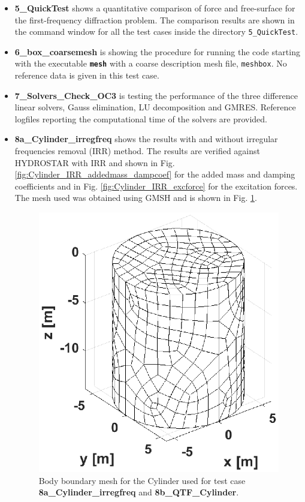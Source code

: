 \documentclass[12pt,a4paper,titlepage]{article}
\begin{document}
\begin{itemize}
\item \textbf{5\_QuickTest} shows a quantitative comparison of force and free-surface for the first-frequency diffraction problem. The comparison results are shown in the command window for all the test cases inside the directory \texttt{5\_QuickTest}.

\item \textbf{6\_box\_coarsemesh} is showing the procedure for running the code starting with the executable \textbf{\texttt{mesh}} with a coarse description mesh file, \texttt{meshbox}. No reference data is given in this test case.

\item \textbf{7\_Solvers\_Check\_OC3} is testing the performance of the three difference linear solvers, Gauss elimination, LU decomposition and GMRES. Reference logfiles reporting the computational time of the solvers are provided.

\item \textbf{8a\_Cylinder\_irregfreq} shows the results with and without irregular frequencies removal (IRR) method. The results are verified against HYDROSTAR with IRR and shown in Fig. \ref{fig:Cylinder_IRR_addedmass_dampcoef} for the added mass and damping coefficients and in Fig. \ref{fig:Cylinder_IRR_excforce} for the excitation forces. The mesh used was obtained using GMSH \cite{gmsh} and is shown in Fig. \ref{fig:meshesCylinder}.

\begin{figure}[h!tbp]
\centering
\includegraphics[scale=0.5,trim = 0mm 0mm 0mm 0mm, clip]{figures/Cylinder/mesh.eps}
\caption{Body boundary mesh for the Cylinder used for test case \textbf{8a\_Cylinder\_irregfreq} and \textbf{8b\_QTF\_Cylinder}.}\label{fig:meshesCylinder}
\end{figure}


\end{itemize}
\end{document}
